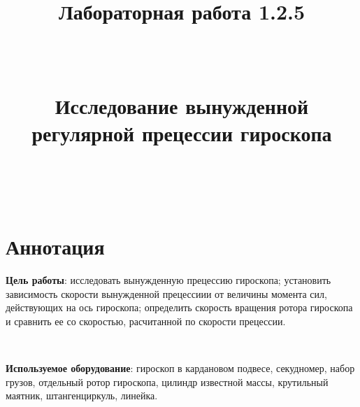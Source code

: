 \title{\textbf{Лабораторная работа 1.2.5}

\

Исследование вынужденной регулярной прецессии гироскопа

\
}
\date{}
\maketitle
\section{Аннотация}
\textbf{Цель работы}: исследовать вынужденную прецессию гироскопа; установить зависимость скорости вынужденной прецессиии от величины момента сил, действующих на ось гироскопа; определить скорость вращения ротора гироскопа и сравнить ее со скоростью, расчитанной по скорости прецессии.

\

\noindent
\textbf{Используемое оборудование}: гироскоп в кардановом подвесе, секудномер, набор грузов, отдельный ротор гироскопа, цилиндр известной массы, крутильный маятник, штангенциркуль, линейка.
